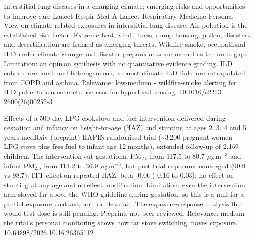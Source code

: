 \documentclass[10pt]{article}
\begin{document}
{Interstitial lung diseases in a changing climate: emerging risks and opportunities to improve care}
{Lancet Respir Med}
{A Lancet Respiratory Medicine Personal View on climate-related exposures in interstitial lung disease. Air pollution is the established risk factor. Extreme heat, viral illness, damp housing, pollen, disasters and desertification are framed as emerging threats. Wildfire smoke, occupational ILD under climate change and disaster preparedness are named as the main gaps. Limitation: an opinion synthesis with no quantitative evidence grading. ILD cohorts are small and heterogeneous, so most climate-ILD links are extrapolated from COPD and asthma. Relevance: low-medium - wildfire-smoke alerting for ILD patients is a concrete use case for hyperlocal sensing.}
{10.1016/s2213-2600(26)00252-3}

\par{}\baselineskip{}\baselineskip
{}

{Effects of a 500-day LPG cookstove and fuel intervention delivered during gestation and infancy on height-for-age (HAZ) and stunting at ages 2, 3, 4 and 5 years}
{medRxiv (preprint)}
{HAPIN randomised trial (\textasciitilde{}3,200 pregnant women; LPG stove plus free fuel to infant age 12 months), extended follow-up of 2,169 children. The intervention cut gestational PM$_{2.5}$ from 117.5 to 80.7 $\mu$g\,m$^{-3}$ and infant PM$_{2.5}$ from 113.2 to 36.9 $\mu$g\,m$^{-3}$, but post-trial exposures converged (99.9 vs 98.7). ITT effect on repeated HAZ: beta -0.06 (-0.16 to 0.03); no effect on stunting at any age and no effect modification. Limitation: even the intervention arm stayed far above the WHO guideline during gestation, so this is a null for a partial exposure contrast, not for clean air. The exposure-response analysis that would test dose is still pending. Preprint, not peer reviewed. Relevance: medium - the trial's personal monitoring shows how far stove switching moves exposure.}
{10.64898/2026.10.16.26365712}

\par{}\baselineskip{}\baselineskip
{}
\end{document}
